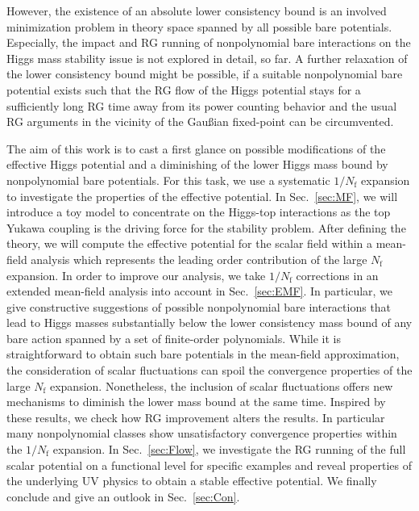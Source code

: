 \documentclass[twocolumn,aps,prd,showpacs,nofootinbib,superscriptaddress,preprintnumbers,floatfix,10pt]{revtex4-1}
\newcommand{\Nf}{N_{\mathrm{f}}}
\begin{document}
However, the existence of an absolute lower consistency bound is an involved minimization problem in theory space spanned by all possible bare potentials.
Especially, the impact and RG running of nonpolynomial bare interactions on the Higgs mass stability issue is not explored in detail, so far. 
A further relaxation of the lower consistency bound might be possible, if a suitable nonpolynomial bare potential exists such that the RG flow of the Higgs potential stays for a sufficiently long RG time away from its power counting behavior and the usual RG arguments in the vicinity of the Gau{\ss}ian fixed-point can be circumvented.


The aim of this work is to cast a first glance on possible modifications of the effective Higgs potential and a diminishing of the lower Higgs mass bound by nonpolynomial bare potentials. 
For this task, we use a systematic $1/\Nf$ expansion to investigate the properties of the effective potential.
In Sec.~\ref{sec:MF}, we will introduce a toy model to concentrate on the Higgs-top interactions as the top Yukawa coupling is the driving force for the stability problem. 
After defining the theory, we will compute the effective potential for the scalar field within a mean-field analysis which represents the leading order contribution of the large $\Nf$ expansion.
In order to improve our analysis, we take $1/\Nf$ corrections in an extended mean-field analysis into account in Sec.~\ref{sec:EMF}. 
In particular, we give constructive suggestions of possible nonpolynomial bare interactions that lead to Higgs masses substantially below the lower consistency mass bound of any bare action spanned by a set of finite-order polynomials. While it is straightforward to obtain such bare potentials in the mean-field approximation, the consideration of scalar fluctuations can spoil the convergence properties of the large $\Nf$ expansion. Nonetheless, the inclusion of scalar fluctuations offers new mechanisms to diminish the lower mass bound at the same time. 
Inspired by these results, we check how RG improvement alters the results. In particular many nonpolynomial classes show unsatisfactory convergence properties within the $1/\Nf$ expansion. In Sec.~\ref{sec:Flow}, we investigate the RG running of the full scalar potential on a functional level for specific examples and reveal properties of the underlying UV physics to obtain a stable effective potential.
%
We finally conclude and give an outlook in Sec.~\ref{sec:Con}.
\end{document}
